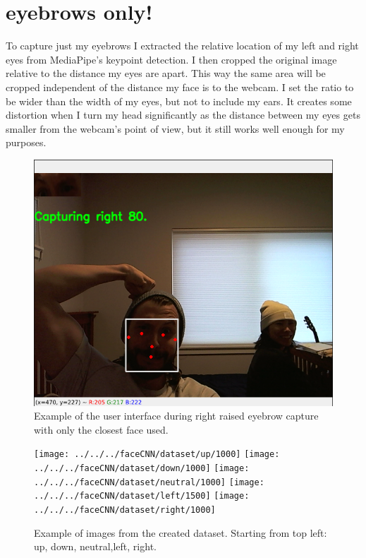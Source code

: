\documentclass[11pt]{scrartcl} %
\begin{document}
\section{eyebrows only!}
To capture just my eyebrows I extracted the relative location of my left and right eyes from MediaPipe's keypoint detection.
I then cropped the original image relative to the distance my eyes are apart. 
This way the same area will be cropped independent of the distance my face is to the webcam.
I set the ratio to be wider than the width of my eyes, but not to include my ears.
It creates some distortion when I turn my head significantly as the distance between my eyes gets smaller from the webcam's point of view, but it still works well enough for my purposes.

\begin{figure}[ht!] %
	\centering
	\includegraphics[width=0.9\columnwidth]{figures/Capturing-Example} 
	\caption{Example of the user interface during right raised eyebrow capture with only the closest face used.}
\end{figure}

\begin{figure}[ht!] %
	\centering
	\texttt{[image: ../../../faceCNN/dataset/up/1000]} 
	\texttt{[image: ../../../faceCNN/dataset/down/1000]} 
	\texttt{[image: ../../../faceCNN/dataset/neutral/1000]} 
	\texttt{[image: ../../../faceCNN/dataset/left/1500]} 
	\texttt{[image: ../../../faceCNN/dataset/right/1000]} 
	\caption{Example of images from the created dataset. Starting from top left: up, down, neutral,left, right.}
\end{figure}
\end{document}
